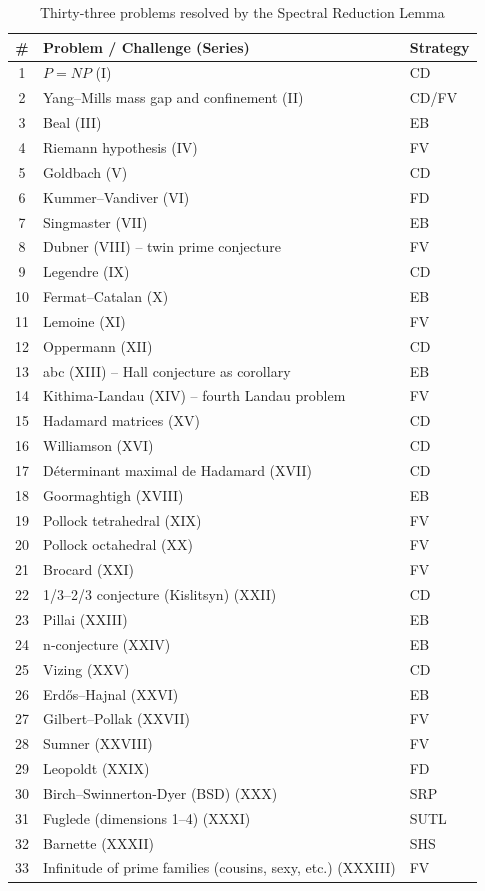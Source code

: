 \documentclass[11pt,a4paper]{article}
\begin{document}
\begin{center}
\begin{longtable}{@{}cll@{}}
\caption{Thirty‑three problems resolved by the Spectral Reduction Lemma}\\
\toprule
\# & Problem / Challenge (Series) & Strategy \\
\midrule
1 & \(P = NP\) (I) & CD \\
2 & Yang–Mills mass gap and confinement (II) & CD/FV \\
3 & Beal (III) & EB \\
4 & Riemann hypothesis (IV) & FV \\
5 & Goldbach (V) & CD \\
6 & Kummer–Vandiver (VI) & FD \\
7 & Singmaster (VII) & EB \\
8 & Dubner (VIII) – twin prime conjecture & FV \\
9 & Legendre (IX) & CD \\
10 & Fermat–Catalan (X) & EB \\
11 & Lemoine (XI) & FV \\
12 & Oppermann (XII) & CD \\
13 & abc (XIII) – Hall conjecture as corollary & EB \\
14 & Kithima‑Landau (XIV) – fourth Landau problem & FV \\
15 & Hadamard matrices (XV) & CD \\
16 & Williamson (XVI) & CD \\
17 & Déterminant maximal de Hadamard (XVII) & CD \\
18 & Goormaghtigh (XVIII) & EB \\
19 & Pollock tetrahedral (XIX) & FV \\
20 & Pollock octahedral (XX) & FV \\
21 & Brocard (XXI) & FV \\
22 & 1/3–2/3 conjecture (Kislitsyn) (XXII) & CD \\
23 & Pillai (XXIII) & EB \\
24 & n‑conjecture (XXIV) & EB \\
25 & Vizing (XXV) & CD \\
26 & Erdős–Hajnal (XXVI) & EB \\
27 & Gilbert–Pollak (XXVII) & FV \\
28 & Sumner (XXVIII) & FV \\
29 & Leopoldt (XXIX) & FD \\
30 & Birch–Swinnerton-Dyer (BSD) (XXX) & SRP \\
31 & Fuglede (dimensions 1–4) (XXXI) & SUTL \\
32 & Barnette (XXXII) & SHS \\
33 & Infinitude of prime families (cousins, sexy, etc.) (XXXIII) & FV \\
\bottomrule
\end{longtable}
\end{center}
\end{document}
